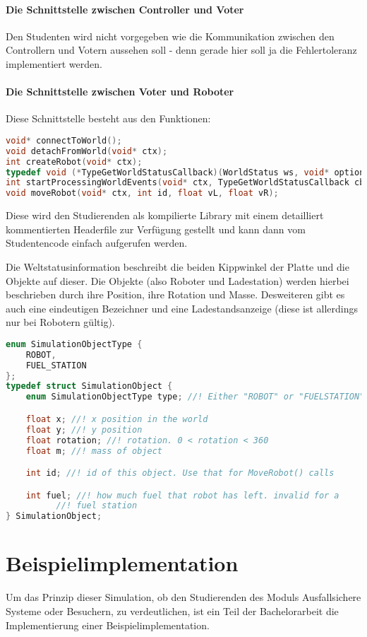 \paragraph{Die Schnittstelle zwischen Controller und Voter} Den Studenten wird nicht vorgegeben wie die Kommunikation zwischen den Controllern und Votern aussehen soll - denn gerade hier soll ja die Fehlertoleranz implementiert werden.

\paragraph{Die Schnittstelle zwischen Voter und Roboter} Diese Schnittstelle besteht aus den Funktionen:
\begin{lstlisting}[frame=single, language=c] 
void* connectToWorld();
void detachFromWorld(void* ctx);
int createRobot(void* ctx);
typedef void (*TypeGetWorldStatusCallback)(WorldStatus ws, void* optional);
int startProcessingWorldEvents(void* ctx, TypeGetWorldStatusCallback cb, void* optional);
void moveRobot(void* ctx, int id, float vL, float vR);
\end{lstlisting}

Diese wird den Studierenden als kompilierte Library mit einem detailliert kommentierten Headerfile zur Verf{\"{u}}gung gestellt und kann
dann vom Studentencode einfach aufgerufen werden.

Die Weltstatusinformation beschreibt die beiden Kippwinkel der Platte und die Objekte auf dieser. Die Objekte (also Roboter und Ladestation) werden hierbei beschrieben
durch ihre Position, ihre Rotation und Masse. Desweiteren gibt es auch eine eindeutigen Bezeichner und eine Ladestandsanzeige (diese ist allerdings nur bei Robotern
g{\"{u}}ltig).
\label{worldstatus} 
\begin{lstlisting}[frame=single, language=c]
enum SimulationObjectType {
	ROBOT,
	FUEL_STATION
};
typedef struct SimulationObject {
	enum SimulationObjectType type; //! Either "ROBOT" or "FUELSTATION"

	float x; //! x position in the world
	float y; //! y position
	float rotation; //! rotation. 0 < rotation < 360
	float m; //! mass of object

	int id; //! id of this object. Use that for MoveRobot() calls

	int fuel; //! how much fuel that robot has left. invalid for a
		  //! fuel station
} SimulationObject;
\end{lstlisting}

\clearpage
\section{Beispielimplementation}
Um das Prinzip dieser Simulation, ob den Studierenden des Moduls Ausfallsichere Systeme oder Besuchern, zu verdeutlichen, ist ein Teil der Bachelorarbeit die Implementierung einer
Beispielimplementation.

